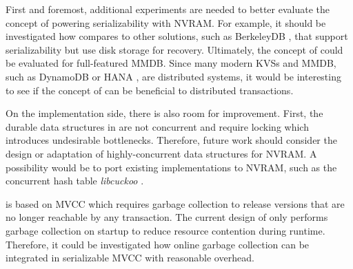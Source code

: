 First and foremost, additional experiments are needed to better evaluate the
concept of powering serializability with NVRAM. For example, it should be
investigated how \midas compares to other solutions, such as BerkeleyDB
\cite{olson1999berkeley}, that support serializability but use disk storage for
recovery. Ultimately, the concept of \midas could be evaluated for full-featured
MMDB. Since many modern \acp{KVS} and MMDB, such as DynamoDB \cite{decandia2007dynamo}
or HANA \cite{lee2013sap}, are distributed systems, it would be interesting to
see if the concept of \midas can be beneficial to distributed transactions.

On the implementation side, there is also room for improvement. First, the
durable data structures in \midas are not concurrent and require locking which
introduces undesirable bottlenecks. Therefore, future work should consider the
design or adaptation of highly-concurrent data structures for NVRAM. A
possibility would be to port existing implementations to NVRAM, such as the
concurrent hash table \emph{libcuckoo} \cite{li2014algorithmic}.

\midas is based on MVCC which requires garbage collection to release versions
that are no longer reachable by any transaction. The current design of \midas
only performs garbage collection on startup to reduce resource contention during
runtime. Therefore, it could be investigated how online garbage collection
can be integrated in serializable MVCC with reasonable overhead.
